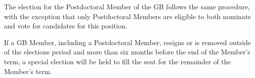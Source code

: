 \documentclass[12pt]{article}
\newcommand{\exec}{{Executive Team}}
\begin{document}


The election for the Postdoctoral Member of the GB follows the same procedure, with the exception that only Postdoctoral Members are eligible to both nominate and vote for candidates for this position.

If a GB Member, including a Postdoctoral Member, resigns or is removed outside of the elections period and more than six months before the end of the Member's term, a special election will be held to fill the seat for the remainder of the Member's term.




\end{document}
